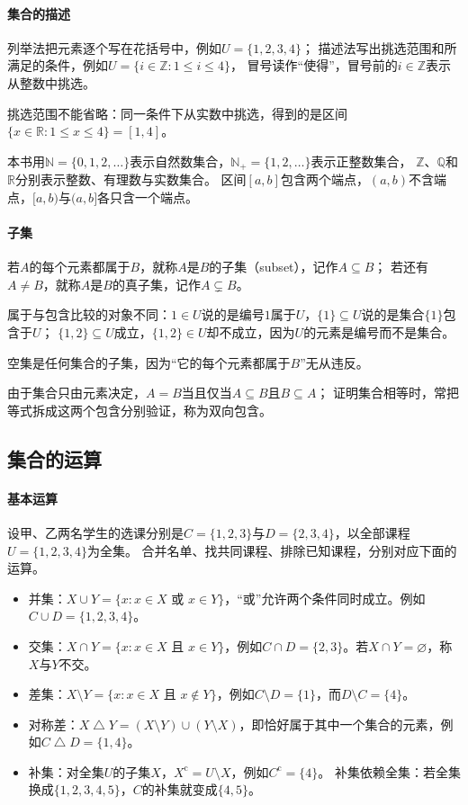 \paragraph{集合的描述}
列举法把元素逐个写在花括号中，例如$U=\{1,2,3,4\}$；
描述法写出挑选范围和所满足的条件，例如$U=\{i\in\mathbb Z:1\leq i\leq4\}$，
冒号读作“使得”，冒号前的$i\in\mathbb Z$表示从整数中挑选。

挑选范围不能省略：同一条件下从实数中挑选，得到的是区间$\{x\in\mathbb R:1\leq x\leq4\}=[1,4]$。

本书用$\mathbb N=\{0,1,2,\ldots\}$表示自然数集合，$\mathbb N_+=\{1,2,\ldots\}$表示正整数集合，
$\mathbb Z$、$\mathbb Q$和$\mathbb R$分别表示整数、有理数与实数集合。
区间$[a,b]$包含两个端点，$(a,b)$不含端点，$[a,b)$与$(a,b]$各只含一个端点。

\paragraph{子集}
若$A$的每个元素都属于$B$，就称$A$是$B$的子集（subset），记作$A\subseteq B$；
若还有$A\neq B$，就称$A$是$B$的真子集，记作$A\subsetneq B$。

属于与包含比较的对象不同：$1\in U$说的是编号$1$属于$U$，$\{1\}\subseteq U$说的是集合$\{1\}$包含于$U$；
$\{1,2\}\subseteq U$成立，$\{1,2\}\in U$却不成立，因为$U$的元素是编号而不是集合。

空集是任何集合的子集，因为“它的每个元素都属于$B$”无从违反。

由于集合只由元素决定，$A=B$当且仅当$A\subseteq B$且$B\subseteq A$；
证明集合相等时，常把等式拆成这两个包含分别验证，称为双向包含。

\subsection{集合的运算}
\label{sec:prelim-set-operations}

\paragraph{基本运算}
设甲、乙两名学生的选课分别是$C=\{1,2,3\}$与$D=\{2,3,4\}$，以全部课程$U=\{1,2,3,4\}$为全集。
合并名单、找共同课程、排除已知课程，分别对应下面的运算。
\begin{itemize}
 \item 并集：$X\cup Y=\{x:x\in X\text{ 或 }x\in Y\}$，“或”允许两个条件同时成立。例如$C\cup D=\{1,2,3,4\}$。
 \item 交集：$X\cap Y=\{x:x\in X\text{ 且 }x\in Y\}$，例如$C\cap D=\{2,3\}$。若$X\cap Y=\varnothing$，称$X$与$Y$不交。
 \item 差集：$X\setminus Y=\{x:x\in X\text{ 且 }x\notin Y\}$，例如$C\setminus D=\{1\}$，而$D\setminus C=\{4\}$。
 \item 对称差：$X\mathbin{\triangle}Y=(X\setminus Y)\cup(Y\setminus X)$，即恰好属于其中一个集合的元素，例如$C\mathbin{\triangle}D=\{1,4\}$。
 \item 补集：对全集$U$的子集$X$，$X^{\mathrm c}=U\setminus X$，例如$C^{\mathrm c}=\{4\}$。
       补集依赖全集：若全集换成$\{1,2,3,4,5\}$，$C$的补集就变成$\{4,5\}$。
\end{itemize}


